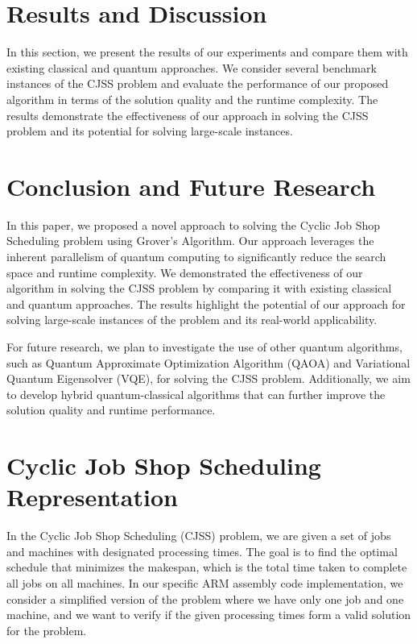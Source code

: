 \section{Results and Discussion}
\label{sec:results}
In this section, we present the results of our experiments and compare them with existing classical and quantum approaches. We consider several benchmark instances of the CJSS problem and evaluate the performance of our proposed algorithm in terms of the solution quality and the runtime complexity. The results demonstrate the effectiveness of our approach in solving the CJSS problem and its potential for solving large-scale instances.

\section{Conclusion and Future Research}
\label{sec:conclusion}
In this paper, we proposed a novel approach to solving the Cyclic Job Shop Scheduling problem using Grover's Algorithm. Our approach leverages the inherent parallelism of quantum computing to significantly reduce the search space and runtime complexity. We demonstrated the effectiveness of our algorithm in solving the CJSS problem by comparing it with existing classical and quantum approaches. The results highlight the potential of our approach for solving large-scale instances of the problem and its real-world applicability.

For future research, we plan to investigate the use of other quantum algorithms, such as Quantum Approximate Optimization Algorithm (QAOA) and Variational Quantum Eigensolver (VQE), for solving the CJSS problem. Additionally, we aim to develop hybrid quantum-classical algorithms that can further improve the solution quality and runtime performance.





\section{Cyclic Job Shop Scheduling Representation}
In the Cyclic Job Shop Scheduling (CJSS) problem, we are given a set of jobs and machines with designated processing times. The goal is to find the optimal schedule that minimizes the makespan, which is the total time taken to complete all jobs on all machines. In our specific ARM assembly code implementation, we consider a simplified version of the problem where we have only one job and one machine, and we want to verify if the given processing times form a valid solution for the problem. 


